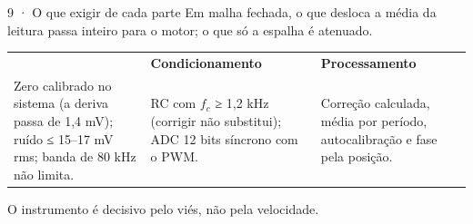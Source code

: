 \documentclass[aspectratio=169,11pt]{beamer}
\makeatletter
\newcommand{\destaque}[1]{\begin{center}\colorbox{azc}{\parbox{.9\textwidth}{\centering\vspace{5pt}#1\vspace{5pt}}}\end{center}}
\newcommand{\pontos}[6]{\begin{tabular}{@{}>{\raggedright\arraybackslash}p{.3\textwidth}@{\hspace{.035\textwidth}}>{\raggedright\arraybackslash}p{.3\textwidth}@{\hspace{.035\textwidth}}>{\raggedright\arraybackslash}p{.3\textwidth}@{}}
#1 & #3 & #5\\[4pt]\small #2 & \small #4 & \small #6\end{tabular}}
\newcommand{\contexto}[1]{{\small\color{cz}#1}\par\vspace{4pt}}
\makeatother
\begin{document}
\begin{frame}{9 · O que exigir de cada parte}
\contexto{Em malha fechada, o que desloca a média da leitura passa inteiro para o motor; o que só a espalha é atenuado.}
\vspace{8pt}
\pontos{{\color{vm}\Large\bfseries Sensor}}{Zero calibrado no sistema (a deriva passa de 1,4 mV); ruído ≤ 15–17 mV rms; banda de 80 kHz não limita.}{{\color{az}\Large\bfseries Condicionamento}}{RC com $f_c$ ≥ 1,2 kHz (corrigir não substitui); ADC 12 bits síncrono com o PWM.}{{\color{az}\Large\bfseries Processamento}}{Correção calculada, média por período, autocalibração e fase pela posição.}
\vspace{18pt}
\destaque{O instrumento é decisivo pelo viés, não pela velocidade.}
\end{frame}
\end{document}
